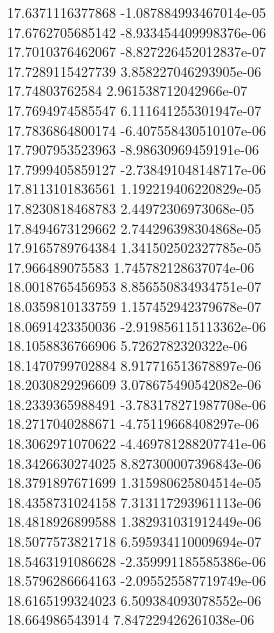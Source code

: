 {17.6371116377868 -1.087884993467014e-05
 \\
17.6762705685142 -8.933454409998376e-06
 \\
17.7010376462067 -8.827226452012837e-07
 \\
17.7289115427739 3.858227046293905e-06
 \\
17.74803762584 2.961538712042966e-07
 \\
17.7694974585547 6.111641255301947e-07
 \\
17.7836864800174 -6.407558430510107e-06
 \\
17.7907953523963 -8.98630969459191e-06
 \\
17.7999405859127 -2.738491048148717e-06
 \\
17.8113101836561 1.192219406220829e-05
 \\
17.8230818468783 2.44972306973068e-05
 \\
17.8494673129662 2.744296398304868e-05
 \\
17.9165789764384 1.341502502327785e-05
 \\
17.966489075583 1.745782128637074e-06
 \\
18.0018765456953 8.856550834934751e-07
 \\
18.0359810133759 1.157452942379678e-07
 \\
18.0691423350036 -2.919856115113362e-06
 \\
18.1058836766906 5.7262782320322e-06
 \\
18.1470799702884 8.917716513678897e-06
 \\
18.2030829296609 3.078675490542082e-06
 \\
18.2339365988491 -3.783178271987708e-06
 \\
18.2717040288671 -4.75119668408297e-06
 \\
18.3062971070622 -4.469781288207741e-06
 \\
18.3426630274025 8.827300007396843e-06
 \\
18.3791897671699 1.315980625804514e-05
 \\
18.4358731024158 7.313117293961113e-06
 \\
18.4818926899588 1.382931031912449e-06
 \\
18.5077573821718 6.595934110009694e-07
 \\
18.5463191086628 -2.359991185585386e-06
 \\
18.5796286664163 -2.095525587719749e-06
 \\
18.6165199324023 6.509384093078552e-06
 \\
18.664986543914 7.847229426261038e-06
}
